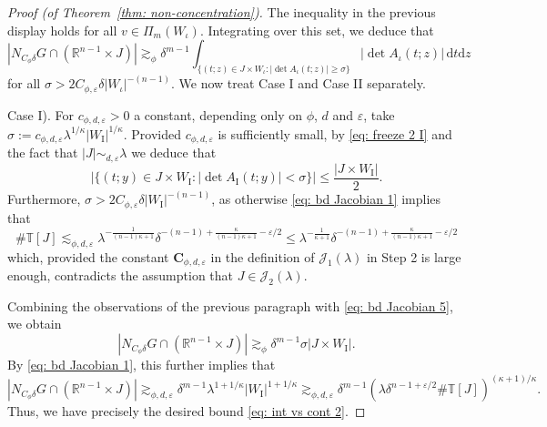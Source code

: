 \documentclass[reqno]{amsart}
\numberwithin{equation}{section}
\newcommand{\R}{\mathbb{R}}
\newcommand{\T}{\mathbb{T}}
\newcommand{\cJ}{\mathcal{J}}
\newcommand{\ud}{\mathrm{d}}
\newcommand{\bC}{\mathbf{C}}
\theoremstyle{plain}
\theoremstyle{definition}
\newcommand{\tI}{\mathrm{I}}
\begin{document}
\begin{proof}[Proof (of Theorem~\ref{thm: non-concentration})]
The inequality in the previous display holds for all $v \in \Pi_m(W_{\iota})$. Integrating over this set, we deduce that 
\begin{equation}\label{eq: bd Jacobian 5}
    |N_{C_\phi\delta} G \cap (\R^{n-1} \times J)| \gtrsim_\phi \delta^{m-1} \int_{\{(t; z) \in J \times W_{\iota} : |\det A_{\iota}(t; z)| \geq \sigma\}} |\det A_{\iota}(t; z)|\, \ud t \ud z
\end{equation}
for all $\sigma > 2C_{\phi, \varepsilon} \delta |W_\iota|^{-(n-1)}$. We now treat Case I and Case II separately.\medskip

\noindent Case I). For $c_{\phi,d,\varepsilon} >0$ a constant, depending only on $\phi$, $d$ and $\varepsilon$, take $\sigma := c_{\phi,d,\varepsilon} \lambda^{1/\kappa} |W_{\tI}|^{1 /\kappa}$. Provided $c_{\phi,d,\varepsilon}$ is sufficiently small, by \eqref{eq: freeze 2 I} and the fact that $|J| \sim_{d,\varepsilon} \lambda$ we deduce that
\begin{equation*}
    |\{(t; y) \in J \times W_{\tI} : |\det A_{\tI}(t; y)| < \sigma\}| \leq \frac{|J \times W_{\tI}|}{2}.
\end{equation*} 
Furthermore, $\sigma> 2C_{\phi, \varepsilon} \delta |W_{\tI}|^{-(n-1)}$, as otherwise \eqref{eq: bd Jacobian 1} implies that
\begin{equation*}
    \#\mathbb{T}[J]\lesssim_{\phi,d,\varepsilon}\lambda^{-\frac{1}{(n-1)\kappa+1}} \delta^{-(n-1)+\frac{\kappa}{(n-1)\kappa+1}-\varepsilon/2} \leq \lambda^{-\frac{1}{\kappa+1}} \delta^{-(n-1)+\frac{\kappa}{(n-1)\kappa+1}-\varepsilon/2}
\end{equation*}
which, provided the constant $\bC_{\phi,d,\varepsilon}$ in the definition of $\cJ_1(\lambda)$ in Step 2 is large enough, contradicts the assumption that $J\in \cJ_2(\lambda)$. 

Combining the observations of the previous paragraph with \eqref{eq: bd Jacobian 5}, we obtain 
\begin{equation*}
  |N_{C_\phi\delta} G \cap (\R^{n-1} \times J)| \gtrsim_\phi \delta^{m-1} \sigma|J \times W_{\tI}|.
\end{equation*}
By \eqref{eq: bd Jacobian 1}, this further implies that 
\begin{equation*}
    |N_{C_\phi\delta} G \cap (\R^{n-1} \times J)|\gtrsim_{\phi, d,\varepsilon}\delta^{m-1}\lambda^{1+1/\kappa} |W_{\tI}|^{1+1/\kappa} \gtrsim_{\phi,d,\varepsilon}  \delta^{m-1}(\lambda\delta^{n-1 + \varepsilon/2}\#\T[J])^{(\kappa+1)/\kappa}.
\end{equation*}
Thus, we have precisely the desired bound \eqref{eq: int vs cont 2}. \medskip


\end{proof}
\end{document}
